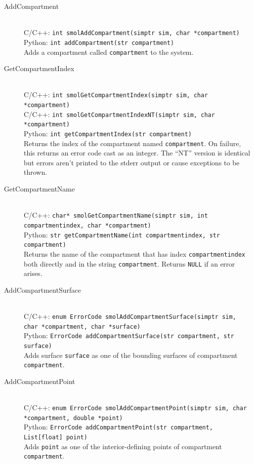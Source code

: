 \documentclass {book}
\newcommand {\ttt} {\texttt}
\begin{document}
\begin{description}

\item[AddCompartment]
\hfill \\
C/C++: \ttt{int smolAddCompartment(simptr sim, char *compartment)}\\
Python: \ttt{int addCompartment(str compartment)}\\
Adds a compartment called \ttt{compartment} to the system.

\item[GetCompartmentIndex]
\hfill \\
C/C++: \ttt{int smolGetCompartmentIndex(simptr sim, char *compartment)}\\
C/C++: \ttt{int smolGetCompartmentIndexNT(simptr sim, char *compartment)}\\
Python: \ttt{int getCompartmentIndex(str compartment)}\\
Returns the index of the compartment named \ttt{compartment}. On failure, this returns an error code cast as an integer. The ``NT'' version is identical but errors aren't printed to the stderr output or cause exceptions to be thrown.

\item[GetCompartmentName]
\hfill \\
C/C++: \ttt{char* smolGetCompartmentName(simptr sim, int compartmentindex, char *compartment)}\\
Python: \ttt{str getCompartmentName(int compartmentindex, str compartment)}\\
Returns the name of the compartment that has index \ttt{compartmentindex} both directly and in the string \ttt{compartment}. Returns \ttt{NULL} if an error arises.

\item[AddCompartmentSurface]
\hfill \\
C/C++: \ttt{enum ErrorCode smolAddCompartmentSurface(simptr sim, char *compartment, char *surface)}\\
Python: \ttt{ErrorCode addCompartmentSurface(str compartment, str surface)}\\
Adds surface \ttt{surface} as one of the bounding surfaces of compartment \ttt{compartment}.

\item[AddCompartmentPoint]
\hfill \\
C/C++: \ttt{enum ErrorCode smolAddCompartmentPoint(simptr sim, char *compartment, double *point)}\\
Python: \ttt{ErrorCode addCompartmentPoint(str compartment, List[float] point)}\\
Adds \ttt{point} as one of the interior-defining points of compartment \ttt{compartment}.


\end{description}
\end{document}
